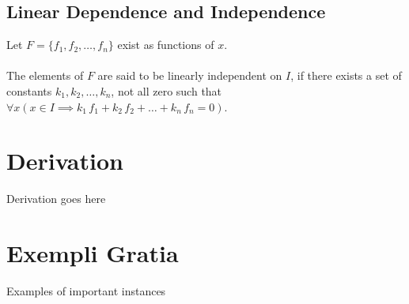 \documentclass{article}
\begin{document}
	\subsection{Linear Dependence and Independence}
		Let $F=\{f_1,f_2,\dots,f_n\}$ exist as functions of $x$.\\
		\\
		The elements of $F$ are said to be linearly independent on $I$, if there exists a set of constants $k_1,k_2,\dots,k_n$, not all zero such that $\forall x(x\in I\implies k_1\,f_1+k_2\,f_2+\dots+k_n\,f_n=0)$.
\section{Derivation}

Derivation goes here

\section{Exempli Gratia}

Examples of important instances
\end{document}
